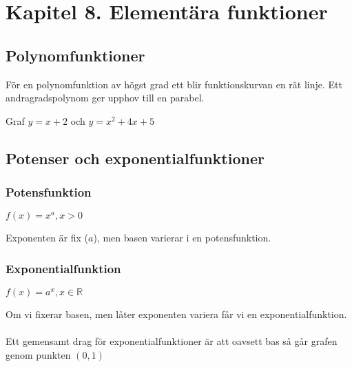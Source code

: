 \documentclass[11pt]{article}
\begin{document}
\section{Kapitel 8. Elementära funktioner}
\subsection{Polynomfunktioner}
För en polynomfunktion av högst grad ett blir funktionskurvan en rät linje. Ett andragradspolynom ger upphov till en parabel. 
\begin{center}
\begin{figure}[h]
  \begin{center}
  \label{bild6}
  \end{center}
  \label{bild7}
\end{figure} 
Graf $y=x+2$ och $y=x^2+4x+5$
\end{center}

\subsection{Potenser och exponentialfunktioner}
\subsubsection{Potensfunktion}
\begin{center}
$f(x) = x^a, x > 0 $
\end{center}
Exponenten är fix ($a$), men basen varierar i en potensfunktion. 
\subsubsection{Exponentialfunktion}
\begin{center}
$f(x) = a^x, x \in \mathbb{R}$
\end{center}
Om vi fixerar basen, men låter exponenten variera får vi en exponentialfunktion. \\
\\
Ett gemensamt drag för exponentialfunktioner är att oavsett bas så går grafen genom punkten $(0,1)$
\end{document}
